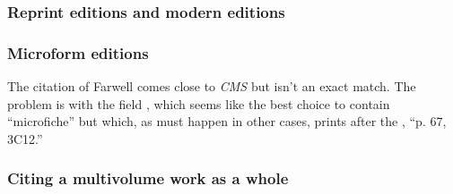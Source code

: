 \documentclass[11pt,letterpaper,oneside]{article}
\begin{document}
\begin{citebib}
\item \cite[401--2]{einsohn2011}
\item \cite[101]{boudett2013}
\item \cite{strunk2000}
\end{citebib}

\subsubsection{Reprint editions and modern editions}


\begin{citebib}
\item \cite[152--53]{barzun1994}
\item \cite{bahadur2014}
\item \cite{emerson1985}
\item \cite{schweitzer1966}
\end{citebib}

\subsubsection{Microform editions}

The citation of Farwell comes close to \textit{CMS} but isn't an exact
match. The problem is with the field , which
seems like the best choice to contain ``microfiche'' but which, as
must happen in other cases, prints after the , ``p.
67, 3C12.''

\begin{citebib}
\item \cite[p. 67, 3C12]{farwell1997}
\item \cite{tauber1958}
\end{citebib}

\setcounter{subsubsection}{116}
\subsubsection{Citing a multivolume work as a whole}
\label{14.117}
\end{document}
